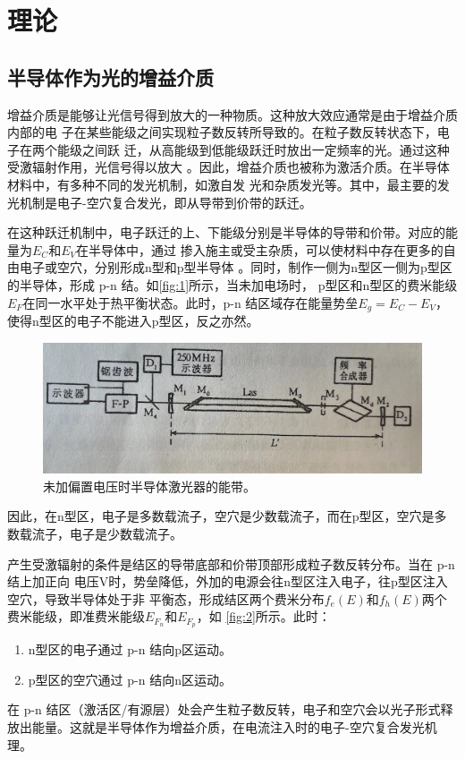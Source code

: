 \documentclass[font=default]{mpltx}
\begin{document}
\section{理论}\label{sec:theory}
\subsection{半导体作为光的增益介质}
增益介质是能够让光信号得到放大的一种物质。这种放大效应通常是由于增益介质内部的电
子在某些能级之间实现粒子数反转所导致的。在粒子数反转状态下，电子在两个能级之间跃
迁，从高能级到低能级跃迁时放出一定频率的光。通过这种受激辐射作用，光信号得以放大
。因此，增益介质也被称为激活介质。在半导体材料中，有多种不同的发光机制，如激自发
光和杂质发光等。其中，最主要的发光机制是电子-空穴复合发光，即从导带到价带的跃迁。\par

在这种跃迁机制中，电子跃迁的上、下能级分别是半导体的导带和价带。对应的能量为$E_C$和$E_V$在半导体中，通过
掺入施主或受主杂质，可以使材料中存在更多的自由电子或空穴，分别形成n型和p型半导体
。同时，制作一侧为n型区一侧为p型区的半导体，形成 p-n 结。如\autoref{fig:1}所示，当未加电场时，
p型区和n型区的费米能级$E_F$在同一水平处于热平衡状态。此时，p-n 结区域存在能量势垒$E_g=E_C-E_V$，
使得n型区的电子不能进入p型区，反之亦然。\par

\begin{figure}
	\centering
	\includegraphics[width=0.85\linewidth]{fig/1.jpg}
	\caption{未加偏置电压时半导体激光器的能带。\cite{laser}}
	\label{fig:1}
\end{figure}

因此，在n型区，电子是多数载流子，空穴是少数载流子，而在p型区，空穴是多数载流子，电子是少数载流子。\par

产生受激辐射的条件是结区的导带底部和价带顶部形成粒子数反转分布。当在 p-n 结上加正向
电压V时，势垒降低，外加的电源会往n型区注入电子，往p型区注入空穴，导致半导体处于非
平衡态，形成结区两个费米分布$f_e(E)$和$f_h(E)$两个费米能级，即准费米能级$E_{F_n}$和$E_{F_p}$，如
\autoref{fig:2}所示。此时：
\begin{enumerate}
	\item n型区的电子通过 p-n 结向p区运动。
	\item p型区的空穴通过 p-n 结向n区运动。
\end{enumerate}
在 p-n 结区（激活区/有源层）处会产生粒子数反转，电子和空穴会以光子形式释放出能量。这就是半导体作为增益介质，在电流注入时的电子-空穴复合发光机理。\par
\end{document}
